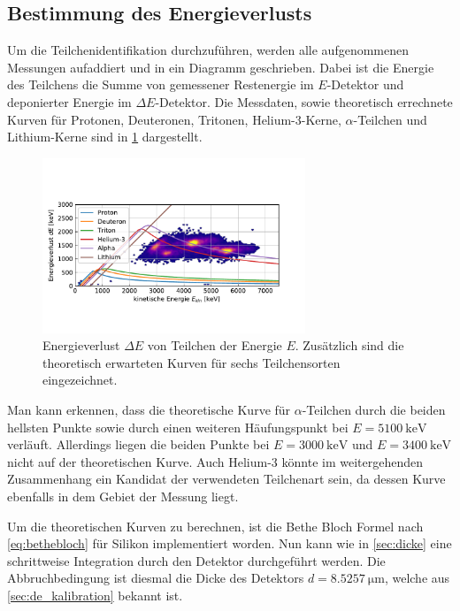 \subsection{Bestimmung des Energieverlusts}

Um die Teilchenidentifikation durchzuführen, werden alle aufgenommenen Messungen aufaddiert und in ein Diagramm geschrieben.
Dabei ist die Energie des Teilchens die Summe von gemessener Restenergie im $E$-Detektor und deponierter Energie im $\Delta E$-Detektor.
Die Messdaten, sowie theoretisch errechnete Kurven für Protonen, Deuteronen, Tritonen, Helium-3-Kerne, $\alpha$-Teilchen und Lithium-Kerne sind in \cref{fig:energieverlust} dargestellt.

\begin{figure}[ht]
	\centering
	\includegraphics[width=0.7\textwidth]{dat/energieverlust.pdf}
	\caption{Energieverlust $\Delta E$ von Teilchen der Energie $E$. Zusätzlich sind die theoretisch erwarteten Kurven für sechs Teilchensorten eingezeichnet.}
	\label{fig:energieverlust}
\end{figure}

Man kann erkennen, dass die theoretische Kurve für $\alpha$-Teilchen durch die beiden hellsten Punkte sowie durch einen weiteren Häufungspunkt bei $E=\SI{5100}{\kilo\electronvolt}$ verläuft.
Allerdings liegen die beiden Punkte bei $E = \SI{3000}{\kilo\electronvolt}$ und $E=\SI{3400}{\kilo\electronvolt}$ nicht auf der theoretischen Kurve.
Auch Helium-3 könnte im weitergehenden Zusammenhang ein Kandidat der verwendeten Teilchenart sein, da dessen Kurve ebenfalls in dem Gebiet der Messung liegt.

Um die theoretischen Kurven zu berechnen, ist die Bethe Bloch Formel nach \cref{eq:bethebloch} für Silikon implementiert worden.
Nun kann wie in \cref{sec:dicke} eine schrittweise Integration durch den Detektor durchgeführt werden.
Die Abbruchbedingung ist diesmal die Dicke des Detektors $d = \SI{8.5257}{\micro\meter}$, welche aus \cref{sec:de_kalibration} bekannt ist.


